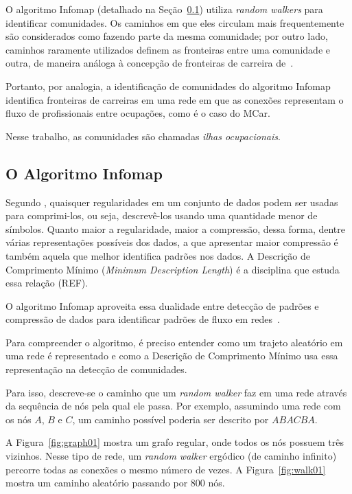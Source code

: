\documentclass[
  article,
  11pt,
  a4paper,
  english,
  brazil,
  sumario=tradicional]{abntex2}
\begin{document}
O algoritmo Infomap (detalhado na Seção~\ref{sec:infomap}) utiliza \textit{random walkers} para identificar comunidades. Os caminhos em que eles circulam mais frequentemente são considerados como fazendo parte da mesma comunidade; por outro lado, caminhos raramente utilizados definem as fronteiras entre uma comunidade e outra, de maneira análoga à concepção de fronteiras de carreira de~.

Portanto, por analogia, a identificação de comunidades do algoritmo Infomap identifica fronteiras de carreiras em uma rede em que as conexões representam o fluxo de profissionais entre ocupações, como é o caso do MCar.

Nesse trabalho, as comunidades são chamadas \textit{ilhas ocupacionais}.

\subsection{O Algoritmo Infomap} \label{sec:infomap}

Segundo , quaisquer regularidades em um conjunto de dados podem ser usadas para comprimi-los, ou seja, descrevê-los usando uma quantidade menor de símbolos. Quanto maior a regularidade, maior a compressão, dessa forma, dentre várias representações possíveis dos dados, a que apresentar maior compressão é também aquela que melhor identifica padrões nos dados. A Descrição de Comprimento Mínimo (\textit{Minimum Description Length}) é a disciplina que estuda essa relação (REF).

O algoritmo Infomap aproveita essa dualidade entre detecção de padrões e compressão de dados para identificar padrões de fluxo em redes~\cite{Rosvall2009-sd}.

Para compreender o algoritmo, é preciso entender como um trajeto aleatório em uma rede é representado e como a Descrição de Comprimento Mínimo usa essa representação na detecção de comunidades.

Para isso, descreve-se o caminho que um \textit{random walker} faz em uma rede através da sequência de nós pela qual ele passa. Por exemplo, assumindo uma rede com os nós $A$, $B$ e $C$, um caminho possível poderia ser descrito por $ABACBA$.

A Figura~\ref{fig:graph01} mostra um grafo regular, onde todos os nós possuem três vizinhos. Nesse tipo de rede, um \textit{random walker} ergódico (de caminho infinito) percorre todas as conexões o mesmo número de vezes. A Figura~\ref{fig:walk01} mostra um caminho aleatório passando por 800 nós.
\end{document}
